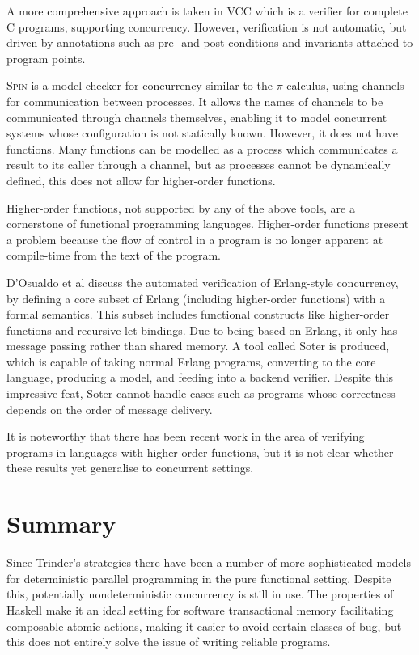 A more comprehensive approach is taken in VCC\cite{vcc} which is a
verifier for complete C programs, supporting concurrency. However,
verification is not automatic, but driven by annotations such as pre-
and post-conditions and invariants attached to program points.

\textsc{Spin}\cite{spin} is a model checker for concurrency similar to
the $\pi$-calculus, using channels for communication between
processes. It allows the names of channels to be communicated through
channels themselves, enabling it to model concurrent systems whose
configuration is not statically known. However, it does not have
functions. Many functions can be modelled as a process which
communicates a result to its caller through a channel, but as
processes cannot be dynamically defined, this does not allow for
higher-order functions.

Higher-order functions, not supported by any of the above tools, are a
cornerstone of functional programming languages. Higher-order
functions present a problem because the flow of control in a program
is no longer apparent at compile-time from the text of the
program\cite{cflow}.

D'Osualdo et al discuss the automated verification of Erlang-style
concurrency, by defining a core subset of Erlang (including
higher-order functions) with a formal semantics\cite{erlang}. This
subset includes functional constructs like higher-order functions and
recursive let bindings. Due to being based on Erlang, it only has
message passing rather than shared memory. A tool called Soter is
produced, which is capable of taking normal Erlang programs,
converting to the core language, producing a model, and feeding into a
backend verifier. Despite this impressive feat, Soter cannot handle
cases such as programs whose correctness depends on the order of
message delivery.

It is noteworthy that there has been recent work in the area of
verifying programs in languages with higher-order
functions\cite{travmc2}, but it is not clear whether these results yet
generalise to concurrent settings.

\section{Summary}
\label{sec:litrev-summary}

Since Trinder's strategies there have been a number of more
sophisticated models for deterministic parallel programming in the
pure functional setting. Despite this, potentially nondeterministic
concurrency is still in use. The properties of Haskell make it an
ideal setting for software transactional memory facilitating
composable atomic actions, making it easier to avoid certain classes
of bug, but this does not entirely solve the issue of writing reliable
programs.

